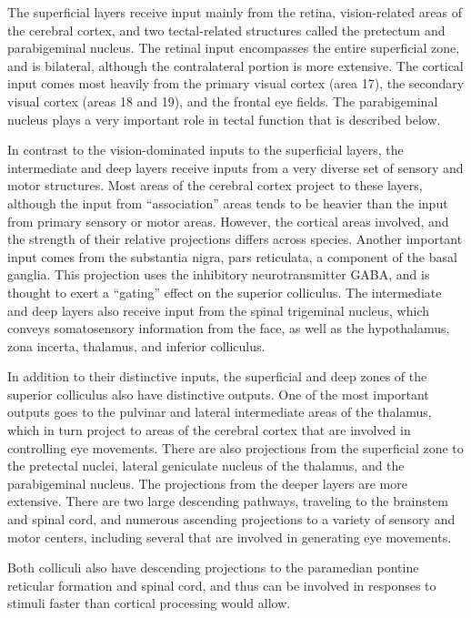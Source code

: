 The superficial layers receive input mainly from the retina, vision-related areas of the cerebral cortex, and two tectal-related structures called the pretectum and parabigeminal nucleus. The retinal input encompasses the entire superficial zone, and is bilateral, although the contralateral portion is more extensive. The cortical input comes most heavily from the primary visual cortex (area 17), the secondary visual cortex (areas 18 and 19), and the frontal eye fields. The parabigeminal nucleus plays a very important role in tectal function that is described below.

In contrast to the vision-dominated inputs to the superficial layers, the intermediate and deep layers receive inputs from a very diverse set of sensory and motor structures. Most areas of the cerebral cortex project to these layers, although the input from ``association'' areas tends to be heavier than the input from primary sensory or motor areas. However, the cortical areas involved, and the strength of their relative projections differs across species. Another important input comes from the substantia nigra, pars reticulata, a component of the basal ganglia. This projection uses the inhibitory neurotransmitter GABA, and is thought to exert a ``gating'' effect on the superior colliculus. The intermediate and deep layers also receive input from the spinal trigeminal nucleus, which conveys somatosensory information from the face, as well as the hypothalamus, zona incerta, thalamus, and inferior colliculus.

In addition to their distinctive inputs, the superficial and deep zones of the superior colliculus also have distinctive outputs. One of the most important outputs goes to the pulvinar and lateral intermediate areas of the thalamus, which in turn project to areas of the cerebral cortex that are involved in controlling eye movements. There are also projections from the superficial zone to the pretectal nuclei, lateral geniculate nucleus of the thalamus, and the parabigeminal nucleus. The projections from the deeper layers are more extensive. There are two large descending pathways, traveling to the brainstem and spinal cord, and numerous ascending projections to a variety of sensory and motor centers, including several that are involved in generating eye movements.

Both colliculi also have descending projections to the paramedian pontine reticular formation and spinal cord, and thus can be involved in responses to stimuli faster than cortical processing would allow.

